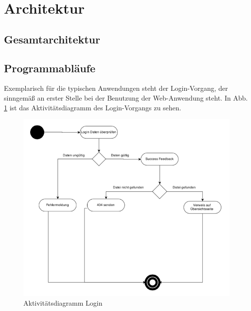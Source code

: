 \documentclass[12pt, oneside, a4paper]{article}		%
\begin{document}
\section{Architektur}

\subsection{Gesamtarchitektur}


\subsection{Programmabläufe}

Exemplarisch für die typischen Anwendungen steht der Login-Vorgang, der sinngemäß an erster Stelle bei der Benutzung der Web-Anwendung steht. In Abb. \ref{AcitivityDiagramLogin} ist das Aktivitätsdiagramm des Login-Vorgangs zu sehen.

\begin{figure}[H]
	\centering
	\includegraphics[width=\linewidth]{footage/ZIMG_ActivityDiagram_Login} 
	\caption{Aktivitätsdiagramm Login}
	\label{AcitivityDiagramLogin}
\end{figure}
\end{document}
